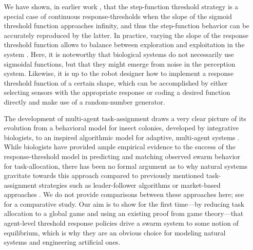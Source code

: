 \documentclass[conference]{ieeeconf}
\begin{document}
We have shown, in earlier work \cite{Kanakia2014}, that the step-function threshold strategy is a special case of continuous response-thresholds when the slope of the sigmoid threshold function approaches infinity, and thus the step-function behavior can be accurately reproduced by the latter. In practice, varying the slope of the response threshold function allows to balance between exploration and exploitation in the system \cite{Bonabeau1997}. Here, it is noteworthy that biological systems do not necessarily use sigmoidal functions, but that they might emerge from noise in the perception system. Likewise, it is up to the robot designer how to implement a response threshold function of a certain shape, which can be accomplished by either selecting sensors with the appropriate response or coding a desired function directly and make use of a random-number generator. 

The development of multi-agent task-assignment draws a very clear picture of its evolution from a behavioral model for insect colonies, developed by integrative biologists, to an inspired algorithmic model for adaptive, multi-agent systems \cite{Krieger2000}. While biologists have provided ample empirical evidence to the success of the response-threshold model in predicting and matching observed swarm behavior for task-allocation, there has been no formal argument as to why natural systems gravitate towards this approach compared to previously mentioned task-assignment strategies such as leader-follower algorithms \cite{Chen2011} or market-based approaches \cite{Amstutz2008,Vig2007}. We do not provide comparisons between these approaches here; see \cite{Kalra2006} for a comparative study. Our aim is to show for the first time---by reducing task allocation to a global game and using an existing proof from game theory\cite{Carlsson1993}---that agent-level threshold response policies drive a swarm system to some notion of equilibrium, which is why they are an obvious choice for modeling natural systems and engineering artificial ones.
\end{document}
